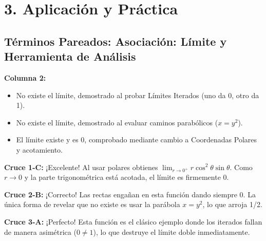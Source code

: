 \documentclass[11pt]{article}
\newenvironment{aplicacion}{%
  \section*{3. Aplicación y Práctica}%
}{}
\newenvironment{pareados}[1]{\subsection*{Términos Pareados: #1}}{\vspace{0.3cm}}
\newcommand{\columnaII}[1]{\textbf{Columna 2:}\begin{itemize}#1\end{itemize}}
\newcommand{\pareo}[2]{\textbf{Cruce #1:} #2\par}
\begin{document}
\begin{aplicacion}
\begin{pareados}{Asociación: Límite y Herramienta de Análisis}
    \columnaII{
      \item No existe el límite, demostrado al probar Límites Iterados (uno da 0, otro da 1).
      \item No existe el límite, demostrado al evaluar caminos parabólicos ($x=y^2$).
      \item El límite existe y es $0$, comprobado mediante cambio a Coordenadas Polares y acotamiento.
    }

    \pareo{1-C}{¡Excelente! Al usar polares obtienes $\displaystyle\lim_{r \to 0^+} r\cos^2\theta \sin\theta$. Como $r \to 0$ y la parte trigonométrica está acotada, el límite es firmemente 0.}
    \pareo{2-B}{¡Correcto! Las rectas engañan en esta función dando siempre 0. La única forma de revelar que no existe es usar la parábola $x=y^2$, lo que arroja 1/2.}
    \pareo{3-A}{¡Perfecto! Esta función es el clásico ejemplo donde los iterados fallan de manera asimétrica ($0 \neq 1$), lo que destruye el límite doble inmediatamente.}

  \end{pareados}

\end{aplicacion}
\end{document}
